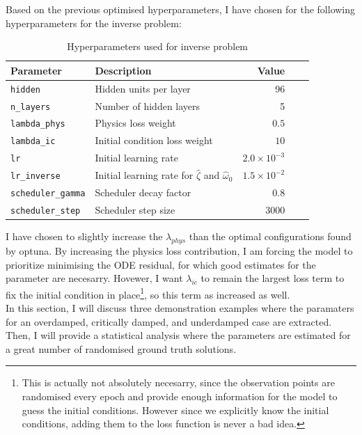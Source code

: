 \documentclass[we,twoside,openright,a4paper,11pt]{uantwerpenbamathesis}
\begin{document}
Based on the previous optimised hyperparameters, I have chosen for the following hyperparameters for the inverse problem:
\begin{table}[H]
\centering
\caption{Hyperparameters used for inverse problem}\label{tab:inverse_hyperparameters}
\begin{tabular}{llrrr}
\toprule
\textbf{Parameter} & \textbf{Description} & \textbf{Value}\\
\midrule
\texttt{hidden}           & Hidden units per layer        & 96 \\
\texttt{n\_layers}        & Number of hidden layers       & 5  \\
\texttt{lambda\_phys}     & Physics loss weight           & $0.5$ \\
\texttt{lambda\_ic}       & Initial condition loss weight & $10$ \\
\texttt{lr}               & Initial learning rate         & $2.0\times10^{-3}$ \\
\texttt{lr\_inverse}      & Initial learning rate for  $\hat\zeta$ and $\hat\omega_0$       & $1.5\times10^{-2}$ \\
\texttt{scheduler\_gamma} & Scheduler decay factor        & $0.8$ \\
\texttt{scheduler\_step}  & Scheduler step size           & 3000  \\
\bottomrule
\end{tabular}
\end{table}

I have chosen to slightly increase the $\lambda_{phys}$ than the optimal configurations found by optuna. By increasing the physics loss contribution, I am forcing the model to prioritize minimising the ODE residual, for which good estimates for the parameter are necesarry. Hovewer, I want $\lambda_{ic}$ to remain the largest loss term to fix the initial condition in place\footnote{This is actually not absolutely necesarry, since the observation points are randomised every epoch and provide enough information for the model to guess the initial conditions. However since we explicitly know the initial conditions, adding them to the loss function is never a bad idea.}, so this term as increased as well.\\

In this section, I will discuss three demonstration examples where the paramaters for an overdamped, critically damped, and underdamped case are extracted. Then, I will provide a statistical analysis where the parameters are estimated for a great number of randomised ground truth solutions.
\end{document}
